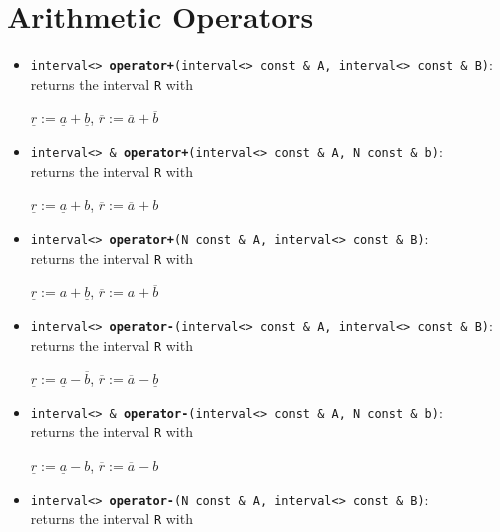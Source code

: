 \documentclass{report}
\begin{document}
\section{Arithmetic Operators}	\label{Funktionen}
	\begin{itemize}
		\item
			\texttt{interval<> {\bf operator+}(interval<> const \& A, interval<> const \& B)}:\\
			returns the interval \texttt{R} with
			\begin{center}
				$\underline{r} := \underline{a}+\underline{b}$,
				$\overline{r} := \overline{a}+\overline{b}$
			\end{center}
		\item
			\texttt{interval<> \& {\bf operator+}(interval<> const \& A, N const \& b)}:\\
			returns the interval \texttt{R} with
			\begin{center}
				$\underline{r} := \underline{a}+b$,
				$\overline{r} := \overline{a}+b$
			\end{center}
                 \item
			\texttt{interval<> {\bf operator+}(N const \& A, interval<> const \& B)}:\\
			returns the interval \texttt{R} with
			\begin{center}
				$\underline{r} := {a}+\underline{b}$,
				$\overline{r} := {a}+\overline{b}$
			\end{center}
		\item
			\texttt{interval<> {\bf operator-}(interval<> const \& A, interval<> const \& B)}:\\
			returns the interval \texttt{R} with
			\begin{center}
				$\underline{r} := \underline{a}-\overline{b}$,
				$\overline{r} := \overline{a}-\underline{b}$
			\end{center}
	\item
			\texttt{interval<> \& {\bf operator-}(interval<> const \& A, N const \& b)}:\\
			returns the interval \texttt{R} with
			\begin{center}
				$\underline{r} := \underline{a}-b$,
				$\overline{r} := \overline{a}-b$
			\end{center}
	\item
			\texttt{interval<> {\bf operator-}(N const \& A, interval<> const \& B)}:\\
			returns the interval \texttt{R} with
			\begin{center}

\end{center}
\end{itemize}
\end{document}
